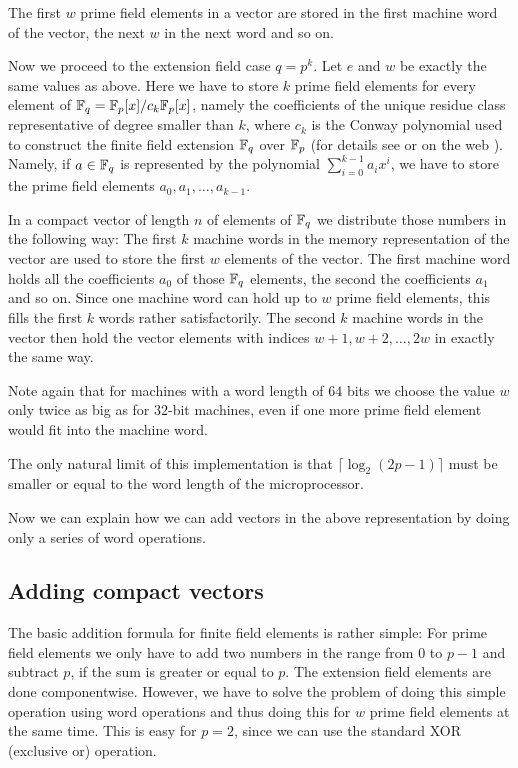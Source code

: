 The first $w$ prime field elements in a vector are stored in the first
machine word of the vector, the next $w$ in the next word and so on.

Now we proceed to the extension field case $q=p^k$. Let $e$ and $w$ be
exactly the same values as above. Here we have to store $k$ prime field
elements for every element of $\mathbb{F}_q = \mathbb{F}_p[x]/c_k\mathbb{F}_p[x]$, namely the 
coefficients of the unique residue class representative of degree smaller 
than $k$, where $c_k$ is the Conway polynomial used to construct the 
%
finite field extension $\mathbb{F}_q$ over $\mathbb{F}_p$ (for details see \cite{Nickel}
or on the web \cite{ConwayFL}). Namely, if $a \in \mathbb{F}_q$ is represented by
the polynomial $\sum_{i=0}^{k-1} a_i x^i$, we have to store the prime 
field elements $a_0, a_1, \ldots, a_{k-1}$. 

In a compact vector of length $n$ of elements of $\mathbb{F}_q$ we distribute
those numbers in the following way: The first $k$ machine words in the
memory representation of the vector are used to store the first $w$
elements of the vector. The first machine word holds all the coefficients
$a_0$ of those $\mathbb{F}_q$ elements, the second the coefficients $a_1$ and so
on. Since one machine word can hold up to $w$ prime field elements, this
fills the first $k$ words rather satisfactorily. The second $k$ machine words
in the vector then hold the vector elements with indices 
$w+1, w+2, \ldots, 2w$ in exactly the same way.

Note again that for machines with a word length of $64$ bits we choose the
value $w$ only twice as big as for $32$-bit machines, even if one more
prime field element would fit into the machine word.

The only natural limit of this implementation is that 
$\lceil \log_2(2p-1) \rceil$ must be smaller or equal to the word length
of the microprocessor.

Now we can explain how we can add vectors in the above representation
by doing only a series of word operations.

\subsection{Adding compact vectors}

The basic addition formula for finite field elements is rather simple:
For prime field elements we only have to add two numbers in the range 
from $0$ to $p-1$ and
subtract $p$, if the sum is greater or equal to $p$. The extension
field elements are done componentwise. However, we have to solve
the problem of doing this simple operation using word operations and 
thus doing this for $w$ prime field elements at the same time.
This is easy for $p=2$, since we can use the standard XOR (exclusive or)
operation.

